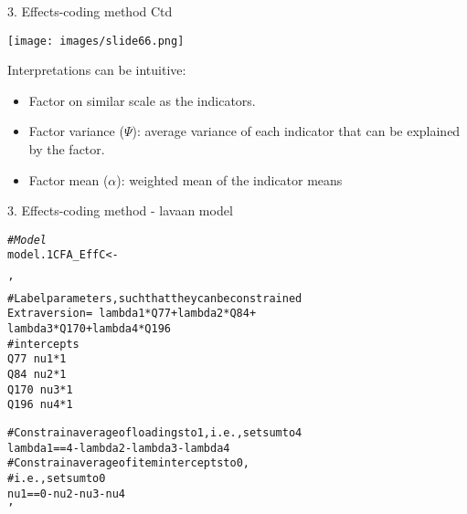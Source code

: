 \documentclass[10pt]{beamer}\usepackage[]{graphicx}\usepackage[]{xcolor}
\makeatletter
\newcommand{\hlsng}[1]{\textcolor[rgb]{0.192,0.494,0.8}{#1}}%
\newcommand{\hlcom}[1]{\textcolor[rgb]{0.678,0.584,0.686}{\textit{#1}}}%
\newcommand{\hldef}[1]{\textcolor[rgb]{0.345,0.345,0.345}{#1}}%
\newcommand{\hlkwb}[1]{\textcolor[rgb]{0.69,0.353,0.396}{#1}}%
\newenvironment{kframe}{%
 \def\at@end@of@kframe{}%
 \ifinner\ifhmode%
  \def\at@end@of@kframe{\end{minipage}}%
  \begin{minipage}{\columnwidth}%
 \fi\fi%
 \def\FrameCommand##1{\hskip\@totalleftmargin \hskip-\fboxsep
 \colorbox{shadecolor}{##1}\hskip-\fboxsep
     \hskip-\linewidth \hskip-\@totalleftmargin \hskip\columnwidth}%
 \MakeFramed {\advance\hsize-\width
   \@totalleftmargin\z@ \linewidth\hsize
   \@setminipage}}%
 {\par\unskip\endMakeFramed%
 \at@end@of@kframe}
\newenvironment{knitrout}{}{} %
\makeatother
\begin{document}
\begin{frame}{3. Effects-coding method Ctd}
    
    {\centering
    \texttt{[image: images/slide66.png]} 
    }
        
Interpretations can be intuitive: 
\begin{itemize}
  \item Factor on similar scale as the indicators.
  \item Factor variance ($\Psi$): average variance of each indicator that can be explained by the factor.
  \item Factor mean ($\alpha$): weighted mean of the indicator means
\end{itemize}
    
\end{frame}
%
\begin{frame}[fragile]{3. Effects-coding method - lavaan model}

\begin{knitrout}
\color{fgcolor}\begin{kframe}
\begin{alltt}
\hlcom{# Model}
\hldef{model.1CFA_EffC} \hlkwb{<-} \hlsng{'
  # Label parameters, such that they can be constrained
  Extraversion =~ lambda1*Q77 + lambda2*Q84 + 
                  lambda3*Q170 + lambda4*Q196
  # intercepts
  Q77  ~ nu1*1
  Q84  ~ nu2*1
  Q170 ~ nu3*1
  Q196 ~ nu4*1
  
  # Constrain average of loadings to 1, i.e., set sum to 4
  lambda1 == 4 - lambda2 - lambda3 - lambda4
  # Constrain average of item intercepts to 0, 
  # i.e., set sum to 0
  nu1 == 0 - nu2 - nu3 - nu4
 '}
\end{alltt}
\end{kframe}
\end{knitrout}

\end{frame}
%
\end{document}
